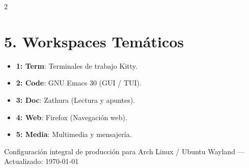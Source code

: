 \documentclass[article,spanish]{apuntes-scr}
\begin{document}
\begin{multicols*}{2}
  \section*{5. Workspaces Temáticos}
  \begin{itemize}[leftmargin=*]
    \item \textbf{1: Term}: Terminales de trabajo Kitty.
    \item \textbf{2: Code}: GNU Emacs 30 (GUI / TUI).
    \item \textbf{3: Doc}: Zathura (Lectura y apuntes).
    \item \textbf{4: Web}: Firefox (Navegación web).
    \item \textbf{5: Media}: Multimedia y mensajería.
  \end{itemize}

\end{multicols*}

\vfill
\begin{center}
  \footnotesize\color{gray}
  Configuración integral de producción para Arch Linux / Ubuntu Wayland — Actualizado: \today
\end{center}
\end{document}

